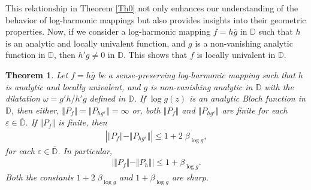 \documentclass[12pt,reqno]{amsart}
\newtheorem{thm}{Theorem}[section]
\newtheorem{open problem}{Open problem}[section]
\newcommand{\ol}{\overline}
\newcommand{\beas}{\begin{eqnarray*}}
\newcommand{\eeas}{\end{eqnarray*}}
\renewcommand{\epsilon}{\varepsilon}
\numberwithin{equation}{section}
\begin{document}
This relationship in \textrm{Theorem \ref{Th0}} not only enhances our understanding of the behavior of log-harmonic mappings but also provides insights into their geometric properties.
Now, if we consider a log-harmonic mapping $f=h\overline{g}$ in $\mathbb{D}$ such that $h$ is an analytic and locally univalent function, and $g$ is a non-vanishing analytic function in $\mathbb{D}$, then $h'g \neq 0$ in $\mathbb{D}$. This shows that $f$ is locally univalent in $\mathbb{D}$.
\begin{thm}\label{Th11}
Let $f=h\overline{g}$ be a sense-preserving log-harmonic mapping such that $h$ is analytic and locally univalent, and $g$ is non-vanishing analytic in $\mathbb{D}$ with the dilatation $\omega=g'h/h'g$ defined in $\mathbb{D}$. If $\log{g(z)}$ is an analytic Bloch function in $\mathbb{D}$, then either, $\Vert P_f \Vert =\Vert P_{hg^{\epsilon}}\Vert =\infty$ or, both $\Vert P_f \Vert $ and $\Vert P_{hg^{\epsilon}}\Vert $ are finite for each $\epsilon\in\ol{\mathbb{D}}$. If $\Vert P_f \Vert $ is finite, then
\beas
\left|\Vert P_f \Vert -\Vert P_{hg^{\epsilon}}\Vert \right|\leq 1+2\;\beta_{\log{g}},
\eeas
for each $\epsilon\in\ol{\mathbb{D}}$. 
In particular,
\beas
\left|\Vert P_f \Vert -\Vert P_{h}\Vert \right|\leq 1+\beta_{\log{g}}.\eeas
Both the constants $ 1+2\;\beta_{\log{g}}$ and $1+\beta_{\log{g}}$ are sharp.
\end{thm}
\end{document}
